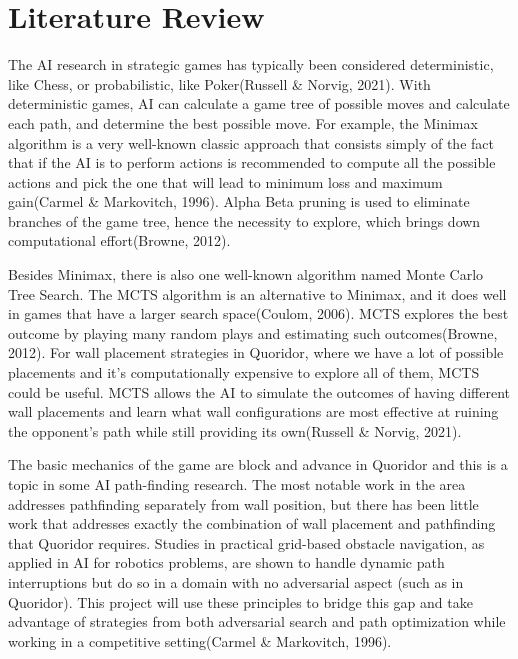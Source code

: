 \documentclass[12pt]{report}
\begin{document}
\newpage

\chapter{Literature Review}
The AI research in strategic games has typically been considered deterministic, like Chess, or probabilistic, like Poker(Russell \& Norvig, 2021). With deterministic games, AI can calculate a game tree of possible moves and calculate each path, and determine the best possible move. For example, the Minimax algorithm is a very well-known classic approach that consists simply of the fact that if the AI is to perform actions is recommended to compute all the possible actions and pick the one that will lead to minimum loss and maximum gain(Carmel \& Markovitch, 1996). Alpha Beta pruning is used to eliminate branches of the game tree, hence the necessity to explore, which brings down computational effort(Browne, 2012).

Besides Minimax, there is also one well-known algorithm named Monte Carlo Tree Search. The MCTS algorithm is an alternative to Minimax, and it does well in games that have a larger search space(Coulom, 2006). MCTS explores the best outcome by playing many random plays and estimating such outcomes(Browne, 2012). For wall placement strategies in Quoridor, where we have a lot of possible placements and it's computationally expensive to explore all of them, MCTS could be useful. MCTS allows the AI to simulate the outcomes of having different wall placements and learn what wall configurations are most effective at ruining the opponent's path while still providing its own(Russell \& Norvig, 2021).

The basic mechanics of the game are block and advance in Quoridor and this is a topic in some AI path-finding research. The most notable work in the area addresses pathfinding separately from wall position, but there has been little work that addresses exactly the combination of wall placement and pathfinding that Quoridor requires. Studies in practical grid-based obstacle navigation, as applied in AI for robotics problems, are shown to handle dynamic path interruptions but do so in a domain with no adversarial aspect (such as in Quoridor). This project will use these principles to bridge this gap and take advantage of strategies from both adversarial search and path optimization while working in a competitive setting(Carmel \& Markovitch, 1996).
\end{document}
